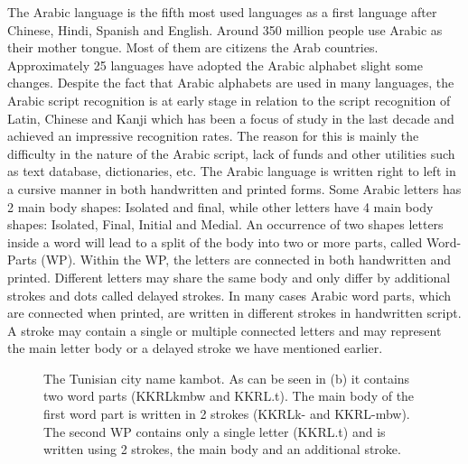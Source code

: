 \documentclass[12pt,journal,compsoc]{IEEEtran}
\begin{document}
The Arabic language is the fifth most used languages as a first language after Chinese, Hindi, Spanish and English. Around 350 million people use Arabic as their mother tongue. Most of them are citizens the Arab countries. Approximately 25 languages have adopted the Arabic alphabet slight some changes. Despite the fact that Arabic alphabets are used in many languages, the Arabic script recognition is at early stage in relation to the script recognition of Latin, Chinese and Kanji which has been a focus of study in the last decade and achieved an impressive recognition rates. The reason for this is mainly the difficulty in the nature of the Arabic script, lack of funds and other utilities such as text database, dictionaries, etc. \cite{zeki2011segmentation}
The Arabic language is written right to left in a cursive manner in both handwritten and printed forms. Some Arabic letters has 2 main body shapes: Isolated and final, while other letters have 4 main body shapes: Isolated, Final, Initial and Medial. An occurrence of two shapes letters inside a word will lead to a split of the body into two or more parts, called Word-Parts (WP). Within the WP, the letters are connected in both handwritten and printed. Different letters may share the same body and only differ by additional strokes and dots called delayed strokes. In many cases Arabic word parts, which are connected when printed, are written in different strokes in handwritten script. A stroke may contain a single or multiple connected letters and may represent the main letter body or a delayed stroke we have mentioned earlier.
 
\begin{figure}[h]
\centering
    \caption{
        The Tunisian city name kambot. As can be seen in (b) it contains two word parts (KKRL{kmbw} and  KKRL{.t}). The main body of the first word part is written in 2 strokes (KKRL{k-} and KKRL{-mbw}). The second WP contains only a single letter (KKRL{.t}) and is written using 2 strokes, the main body and an additional stroke.   
     }
   \label{fig:kmbot}
\end{figure}
\end{document}
